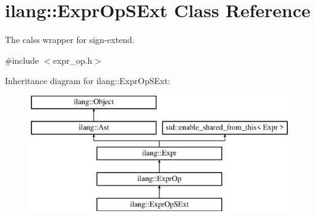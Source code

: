 \hypertarget{classilang_1_1_expr_op_s_ext}{}\section{ilang\+:\+:Expr\+Op\+S\+Ext Class Reference}
\label{classilang_1_1_expr_op_s_ext}


The calss wrapper for sign-\/extend.  




{\ttfamily \#include $<$expr\+\_\+op.\+h$>$}

Inheritance diagram for ilang\+:\+:Expr\+Op\+S\+Ext\+:\begin{figure}[H]
\begin{center}
\leavevmode
\includegraphics[height=5.000000cm]{classilang_1_1_expr_op_s_ext}
\end{center}
\end{figure}
